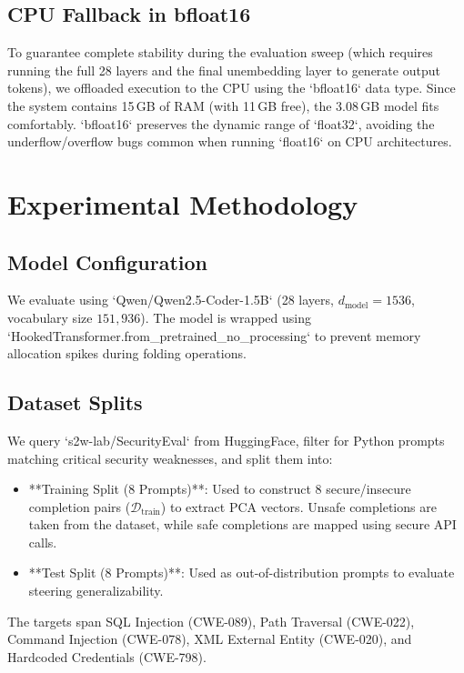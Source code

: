 \documentclass[journal, onecolumn]{IEEEtran}
\begin{document}
\subsection{CPU Fallback in bfloat16}
To guarantee complete stability during the evaluation sweep (which requires running the full 28 layers and the final unembedding layer to generate output tokens), we offloaded execution to the CPU using the `bfloat16` data type. Since the system contains 15\,GB of RAM (with 11\,GB free), the 3.08\,GB model fits comfortably. `bfloat16` preserves the dynamic range of `float32`, avoiding the underflow/overflow bugs common when running `float16` on CPU architectures.

\section{Experimental Methodology}
\label{sec:experiments}

\subsection{Model Configuration}
We evaluate using `Qwen/Qwen2.5-Coder-1.5B` (28 layers, $d_{\text{model}} = 1536$, vocabulary size $151,936$). The model is wrapped using `HookedTransformer.from_pretrained_no_processing` to prevent memory allocation spikes during folding operations.

\subsection{Dataset Splits}
We query `s2w-lab/SecurityEval` from HuggingFace, filter for Python prompts matching critical security weaknesses, and split them into:
\begin{itemize}
    \item **Training Split (8 Prompts)**: Used to construct 8 secure/insecure completion pairs ($\mathcal{D}_{\text{train}}$) to extract PCA vectors. Unsafe completions are taken from the dataset, while safe completions are mapped using secure API calls.
    \item **Test Split (8 Prompts)**: Used as out-of-distribution prompts to evaluate steering generalizability.
\end{itemize}
The targets span SQL Injection (CWE-089), Path Traversal (CWE-022), Command Injection (CWE-078), XML External Entity (CWE-020), and Hardcoded Credentials (CWE-798).
\end{document}
